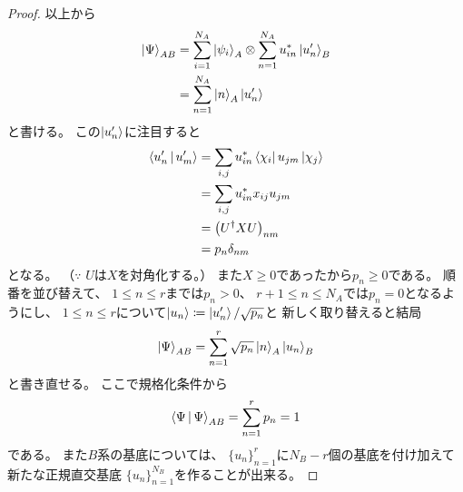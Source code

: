 \documentclass[a4paper, 10pt]{jsarticle}
\begin{document}
\begin{proof}
	以上から
	\begin{align}
		\Ket{\Psi}_{AB}
		&= \sum_{i=1}^{N_A} \Ket{\psi_i}_A \otimes
		\sum_{n=1}^{N_A} u^*_{in} \Ket{u'_n}_B \\
		&= \sum_{n=1}^{N_A} \Ket{n}_A \Ket{u'_n}
	\end{align}
	と書ける。
	この$\Ket{u'_n}$に注目すると
	\begin{align}
		\Braket{u'_n | u'_m}
		&= \sum_{i,j} u^*_{in} \Bra{\chi_i} u_{jm} \Ket{\chi_j} \\
		&= \sum_{i,j} u^*_{in} x_{ij} u_{jm} \\
		&= \left( U^\dagger X U \right)_{nm} \\
		&= p_n \delta_{nm}
	\end{align}
	となる。
	（$\because$ $U$は$X$を対角化する。）
	また$X \geq 0$であったから$p_n \geq 0$である。
	順番を並び替えて、
	$1 \leq n \leq r$までは$p_n > 0$、
	$r + 1 \leq n \leq N_A$では$p_n = 0$となるようにし、
	$1 \leq n \leq r$について$\Ket{u_n} \coloneqq \Ket{u'_n} / \sqrt{p_n}$と
	新しく取り替えると結局
	\begin{align}
		\Ket{\Psi}_{AB} = \sum_{n=1}^{r} \sqrt{p_n} \Ket{n}_A \Ket{u_n}_B
	\end{align}
	と書き直せる。
	ここで規格化条件から
	\begin{align}
		\Braket{\Psi | \Psi}_{AB}
		= \sum_{n=1}^{r} p_n
		= 1
	\end{align}
	である。
	また$B$系の基底については、
	$\{u_n\}_{n=1}^{r}$に$N_B - r$個の基底を付け加えて新たな正規直交基底
	$\{u_n\}_{n=1}^{N_B}$を作ることが出来る。
\end{proof}
\end{document}
